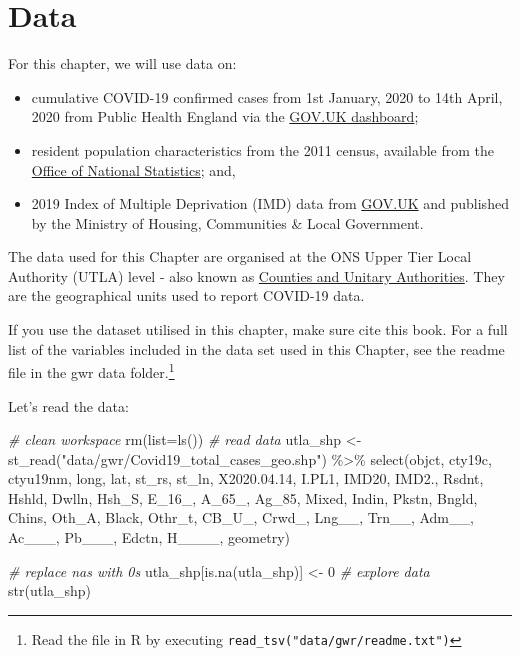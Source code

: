\documentclass[
]{book}
\newenvironment{Shaded}{\begin{snugshade}}{\end{snugshade}}
\newcommand{\AttributeTok}[1]{\textcolor[rgb]{0.77,0.63,0.00}{#1}}
\newcommand{\CommentTok}[1]{\textcolor[rgb]{0.56,0.35,0.01}{\textit{#1}}}
\newcommand{\DecValTok}[1]{\textcolor[rgb]{0.00,0.00,0.81}{#1}}
\newcommand{\FloatTok}[1]{\textcolor[rgb]{0.00,0.00,0.81}{#1}}
\newcommand{\FunctionTok}[1]{\textcolor[rgb]{0.00,0.00,0.00}{#1}}
\newcommand{\NormalTok}[1]{#1}
\newcommand{\OtherTok}[1]{\textcolor[rgb]{0.56,0.35,0.01}{#1}}
\newcommand{\SpecialCharTok}[1]{\textcolor[rgb]{0.00,0.00,0.00}{#1}}
\newcommand{\StringTok}[1]{\textcolor[rgb]{0.31,0.60,0.02}{#1}}
\begin{document}
\hypertarget{data-5}{%
\section{Data}\label{data-5}}

For this chapter, we will use data on:

\begin{itemize}
\item
  cumulative COVID-19 confirmed cases from 1st January, 2020 to 14th April, 2020 from Public Health England via the \href{https://coronavirus.data.gov.uk}{GOV.UK dashboard};
\item
  resident population characteristics from the 2011 census, available from the \href{https://www.nomisweb.co.uk/home/census2001.asp}{Office of National Statistics}; and,
\item
  2019 Index of Multiple Deprivation (IMD) data from \href{https://www.gov.uk/government/statistics/english-indices-of-deprivation-2019}{GOV.UK} and published by the Ministry of Housing, Communities \& Local Government.
\end{itemize}

The data used for this Chapter are organised at the ONS Upper Tier Local Authority (UTLA) level - also known as \href{https://geoportal.statistics.gov.uk/datasets/fe6bcee87d95476abc84e194fe088abb_0}{Counties and Unitary Authorities}. They are the geographical units used to report COVID-19 data.

If you use the dataset utilised in this chapter, make sure cite this book. For a full list of the variables included in the data set used in this Chapter, see the readme file in the gwr data folder.\footnote{Read the file in R by executing \texttt{read\_tsv("data/gwr/readme.txt")}}

Let's read the data:

\begin{Shaded}
\begin{Highlighting}[]
\CommentTok{\# clean workspace}
\FunctionTok{rm}\NormalTok{(}\AttributeTok{list=}\FunctionTok{ls}\NormalTok{())}
\CommentTok{\# read data}
\NormalTok{utla\_shp }\OtherTok{\textless{}{-}} \FunctionTok{st\_read}\NormalTok{(}\StringTok{"data/gwr/Covid19\_total\_cases\_geo.shp"}\NormalTok{) }\SpecialCharTok{\%\textgreater{}\%}
  \FunctionTok{select}\NormalTok{(objct, cty19c, ctyu19nm, long, lat, st\_rs, st\_ln, X2020.}\FloatTok{04.14}\NormalTok{, I.PL1, IMD20, IMD2., Rsdnt, Hshld, Dwlln, Hsh\_S, E\_16\_, A\_65\_, Ag\_85, Mixed, Indin, Pkstn, Bngld, Chins, Oth\_A, Black, Othr\_t, CB\_U\_, Crwd\_, Lng\_\_, Trn\_\_, Adm\_\_, Ac\_\_\_, Pb\_\_\_, Edctn, H\_\_\_\_, geometry)}

\CommentTok{\# replace nas with 0s}
\NormalTok{utla\_shp[}\FunctionTok{is.na}\NormalTok{(utla\_shp)] }\OtherTok{\textless{}{-}} \DecValTok{0}
\CommentTok{\# explore data}
\FunctionTok{str}\NormalTok{(utla\_shp)}
\end{Highlighting}
\end{Shaded}
\end{document}
